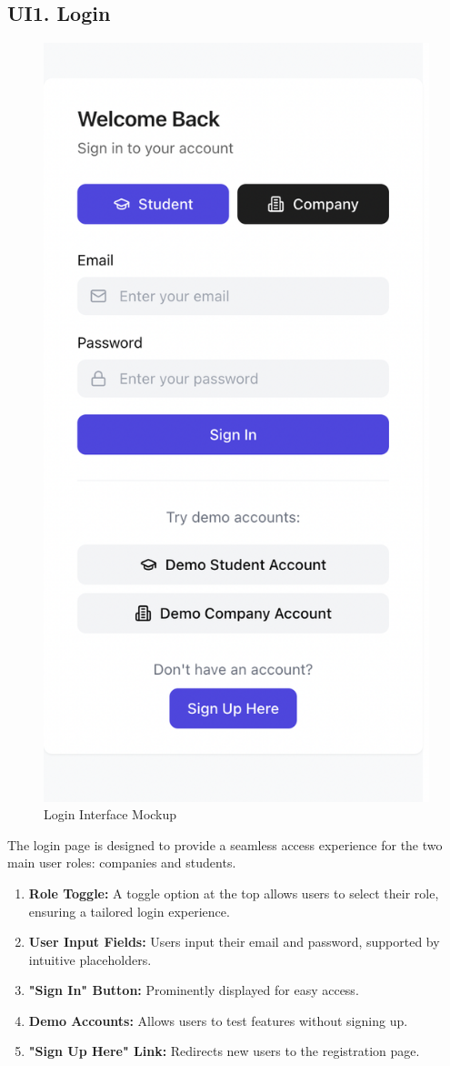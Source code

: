 \subsection{UI1. Login}
\label{subsec:login_ui}%
\begin{figure}[H]
    \begin{center}
        \includegraphics[width=0.52\linewidth]{JhaBhatiaSharma/imagesDD/LoginMockup.png}
        \caption{Login Interface Mockup}
        \label{fig:LoginInterface}
    \end{center}
\end{figure}
The login page is designed to provide a seamless access experience for the two main user roles: companies and students. 

\begin{enumerate}
    \item \textbf{Role Toggle:} A toggle option at the top allows users to select their role, ensuring a tailored login experience.
    \item \textbf{User Input Fields:} Users input their email and password, supported by intuitive placeholders.
    \item \textbf{"Sign In" Button:} Prominently displayed for easy access.
    \item \textbf{Demo Accounts:} Allows users to test features without signing up.
    \item \textbf{"Sign Up Here" Link:} Redirects new users to the registration page.
\end{enumerate}

